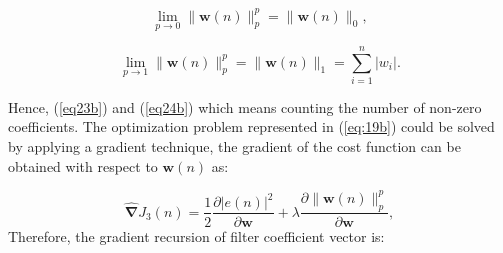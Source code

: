 \vspace{-1cm}
\begin{equation}
\lim_{p\to 0}\|\textbf{w}(n)\|_p^p=\|\textbf{w}(n)\|_{0},\label{eq23b}
\end{equation}

\vspace{-1.5cm}
\begin{equation}
\lim_{p\to 1}\|\textbf{w}(n)\|_p^p=\|\textbf{w}(n)\|_{1}=\sum_{i=1}^{n}|w_i|.\label{eq24b}
\end{equation}

\noindent Hence, (\ref{eq23b}) and (\ref{eq24b}) which means counting the number of non-zero coefficients. The optimization problem represented in (\ref{eq:19b}) could be solved by applying a gradient technique, the gradient of the cost function can be obtained with respect to $\textbf{w}(n)$ as:


\vspace{-1.5cm}
\begin{equation}
\widehat{\boldsymbol\nabla}J_{3}(n)=\frac{1}{2}\frac{\partial |e(n)|^2}{\partial \textbf{w}}+ \lambda\frac{\partial \|\textbf{w}(n)\|_p^p}{\partial \textbf{w}},\label{eq25b}
\end{equation}
\vspace{-0.6cm}
\noindent Therefore, the gradient recursion of filter coefficient vector is:


